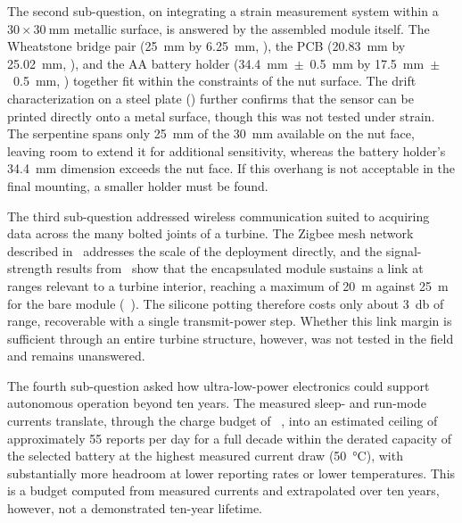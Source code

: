 The second sub-question, on integrating a strain measurement system within a $30\times\SI{30}{\milli\meter}$ metallic surface, is answered by the assembled module itself. The Wheatstone bridge pair (\SI{25}{\milli\meter} by \SI{6.25}{\milli\meter}, ), the PCB (\SI{20.83}{\milli\meter} by \SI{25.02}{\milli\meter}, ), and the \textonehalf AA battery holder (\SI{34.4}{\milli\meter}~$\pm$~\SI{0.5}{\milli\meter} by \SI{17.5}{\milli\meter}~$\pm$~\SI{0.5}{\milli\meter}, ) together fit within the constraints of the nut surface. The drift characterization on a steel plate () further confirms that the sensor can be printed directly onto a metal surface, though this was not tested under strain. The serpentine spans only \SI{25}{\milli\meter} of the \SI{30}{\milli\meter} available on the nut face, leaving room to extend it for additional sensitivity, whereas the battery holder's \SI{34.4}{\milli\meter} dimension exceeds the nut face. If this overhang is not acceptable in the final mounting, a smaller holder must be found.

The third sub-question addressed wireless communication suited to acquiring data across the many bolted joints of a turbine. The Zigbee mesh network described in~ addresses the scale of the deployment directly, and the signal-strength results from~ show that the encapsulated module sustains a link at ranges relevant to a turbine interior, reaching a maximum of \SI{20}{\meter} against \SI{25}{\meter} for the bare module (~). The silicone potting therefore costs only about \SI{3}{\decibel} of range, recoverable with a single transmit-power step. Whether this link margin is sufficient through an entire turbine structure, however, was not tested in the field and remains unanswered.

The fourth sub-question asked how ultra-low-power electronics could support autonomous operation beyond ten years. The measured sleep- and run-mode currents translate, through the charge budget of ~, into an estimated ceiling of approximately 55 reports per day for a full decade within the derated capacity of the selected battery at the highest measured current draw (\SI{50}{\celsius}), with substantially more headroom at lower reporting rates or lower temperatures. This is a budget computed from measured currents and extrapolated over ten years, however, not a demonstrated ten-year lifetime.

